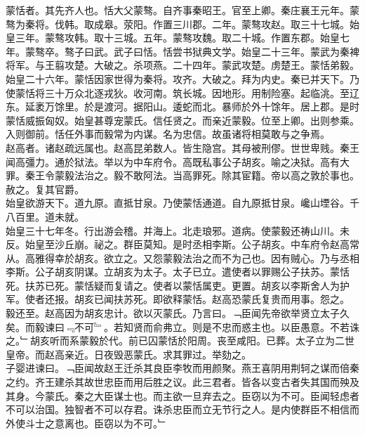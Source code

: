 \documentclass{zhvt-classic}
\begin{document}

\hspace*{2em}蒙恬者。其先齐人也。恬大父蒙骜。自齐事秦昭王。官至上卿。秦庄襄王元年。蒙骜为秦将。伐韩。取成皋。荥阳。作置三川郡。二年。蒙骜攻赵。取三十七城。始皇三年。蒙骜攻韩。取十三城。五年。蒙骜攻魏。取二十城。作置东郡。始皇七年。蒙骜卒。骜子曰武。武子曰恬。恬尝书狱典文学。始皇二十三年。蒙武为秦裨将军。与王翦攻楚。大破之。杀项燕。二十四年。蒙武攻楚。虏楚王。蒙恬弟毅。\\
\hspace*{2em}始皇二十六年。蒙恬因家世得为秦将。攻齐。大破之。拜为内史。秦已并天下。乃使蒙恬将三十万众北逐戎狄。收河南。筑长城。因地形。用制险塞。起临洮。至辽东。延袤万馀里。於是渡河。据阳山。逶蛇而北。暴师於外十馀年。居上郡。是时蒙恬威振匈奴。始皇甚尊宠蒙氏。信任贤之。而亲近蒙毅。位至上卿。出则参乘。入则御前。恬任外事而毅常为内谋。名为忠信。故虽诸将相莫敢与之争焉。\\
\hspace*{2em}赵高者。诸赵疏远属也。赵高昆弟数人。皆生隐宫。其母被刑僇。世世卑贱。秦王闻高彊力。通於狱法。举以为中车府令。高既私事公子胡亥。喻之决狱。高有大罪。秦王令蒙毅法治之。毅不敢阿法。当高罪死。除其宦籍。帝以高之敦於事也。赦之。复其官爵。\\
\hspace*{2em}始皇欲游天下。道九原。直抵甘泉。乃使蒙恬通道。自九原抵甘泉。巉山堙谷。千八百里。道未就。\\
\hspace*{2em}始皇三十七年冬。行出游会稽。并海上。北走琅邪。道病。使蒙毅还祷山川。未反。始皇至沙丘崩。祕之。群臣莫知。是时丞相李斯。公子胡亥。中车府令赵高常从。高雅得幸於胡亥。欲立之。又怨蒙毅法治之而不为己也。因有贼心。乃与丞相李斯。公子胡亥阴谋。立胡亥为太子。太子已立。遣使者以罪赐公子扶苏。蒙恬死。扶苏已死。蒙恬疑而复请之。使者以蒙恬属吏。更置。胡亥以李斯舍人为护军。使者还报。胡亥已闻扶苏死。即欲释蒙恬。赵高恐蒙氏复贵而用事。怨之。\\
\hspace*{2em}毅还至。赵高因为胡亥忠计。欲以灭蒙氏。乃言曰。﹁臣闻先帝欲举贤立太子久矣。而毅谏曰﹃不可﹄。若知贤而俞弗立。则是不忠而惑主也。以臣愚意。不若诛之。﹂胡亥听而系蒙毅於代。前已囚蒙恬於阳周。丧至咸阳。已葬。太子立为二世皇帝。而赵高亲近。日夜毁恶蒙氏。求其罪过。举劾之。\\
\hspace*{2em}子婴进谏曰。﹁臣闻故赵王迁杀其良臣李牧而用颜聚。燕王喜阴用荆轲之谋而倍秦之约。齐王建杀其故世忠臣而用后胜之议。此三君者。皆各以变古者失其国而殃及其身。今蒙氏。秦之大臣谋士也。而主欲一旦弃去之。臣窃以为不可。臣闻轻虑者不可以治国。独智者不可以存君。诛杀忠臣而立无节行之人。是内使群臣不相信而外使斗士之意离也。臣窃以为不可。﹂\\
\end{document}
